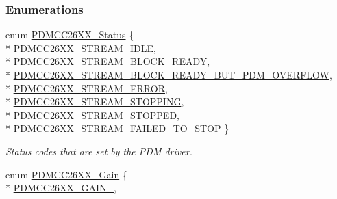 \subsubsection*{Enumerations}
\begin{DoxyCompactItemize}
\item 
enum \hyperlink{_p_d_m_c_c26_x_x_8h_afbfe993e790be75708df00186070a779}{P\+D\+M\+C\+C26\+X\+X\+\_\+\+Status} \{ \\*
\hyperlink{_p_d_m_c_c26_x_x_8h_afbfe993e790be75708df00186070a779a6541acf36472a5a4bae1e918532f5bab}{P\+D\+M\+C\+C26\+X\+X\+\_\+\+S\+T\+R\+E\+A\+M\+\_\+\+I\+D\+L\+E}, 
\\*
\hyperlink{_p_d_m_c_c26_x_x_8h_afbfe993e790be75708df00186070a779a7fbacf5e84041b2a8b635df5cf1789a6}{P\+D\+M\+C\+C26\+X\+X\+\_\+\+S\+T\+R\+E\+A\+M\+\_\+\+B\+L\+O\+C\+K\+\_\+\+R\+E\+A\+D\+Y}, 
\\*
\hyperlink{_p_d_m_c_c26_x_x_8h_afbfe993e790be75708df00186070a779a3bb09525b04c787e27fa7ce2505ebcbe}{P\+D\+M\+C\+C26\+X\+X\+\_\+\+S\+T\+R\+E\+A\+M\+\_\+\+B\+L\+O\+C\+K\+\_\+\+R\+E\+A\+D\+Y\+\_\+\+B\+U\+T\+\_\+\+P\+D\+M\+\_\+\+O\+V\+E\+R\+F\+L\+O\+W}, 
\\*
\hyperlink{_p_d_m_c_c26_x_x_8h_afbfe993e790be75708df00186070a779addbca577e199cd8cad66eb880d81896b}{P\+D\+M\+C\+C26\+X\+X\+\_\+\+S\+T\+R\+E\+A\+M\+\_\+\+E\+R\+R\+O\+R}, 
\\*
\hyperlink{_p_d_m_c_c26_x_x_8h_afbfe993e790be75708df00186070a779a57716d15faf09d4f066fe77f473de9db}{P\+D\+M\+C\+C26\+X\+X\+\_\+\+S\+T\+R\+E\+A\+M\+\_\+\+S\+T\+O\+P\+P\+I\+N\+G}, 
\\*
\hyperlink{_p_d_m_c_c26_x_x_8h_afbfe993e790be75708df00186070a779a772c35528b1c577ee8702c064c37554f}{P\+D\+M\+C\+C26\+X\+X\+\_\+\+S\+T\+R\+E\+A\+M\+\_\+\+S\+T\+O\+P\+P\+E\+D}, 
\\*
\hyperlink{_p_d_m_c_c26_x_x_8h_afbfe993e790be75708df00186070a779addce783eed694cb817cd67ae51d036d5}{P\+D\+M\+C\+C26\+X\+X\+\_\+\+S\+T\+R\+E\+A\+M\+\_\+\+F\+A\+I\+L\+E\+D\+\_\+\+T\+O\+\_\+\+S\+T\+O\+P}
 \}
\begin{DoxyCompactList}\small\item\em Status codes that are set by the P\+D\+M driver. \end{DoxyCompactList}\item 
enum \hyperlink{_p_d_m_c_c26_x_x_8h_a8c2d67aee547a2c8228465034ae0267f}{P\+D\+M\+C\+C26\+X\+X\+\_\+\+Gain} \{ \\*
\hyperlink{_p_d_m_c_c26_x_x_8h_a8c2d67aee547a2c8228465034ae0267fad32df2e2c24bdb0d67c3ec63c0c46178}{P\+D\+M\+C\+C26\+X\+X\+\_\+\+G\+A\+I\+N\+\_}, 

\end{DoxyCompactItemize}
